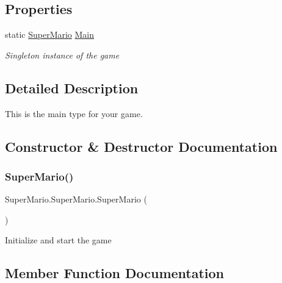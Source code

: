 \subsection*{Properties}
\begin{DoxyCompactItemize}
\item 
static \mbox{\hyperlink{class_super_mario_1_1_super_mario}{Super\+Mario}} \mbox{\hyperlink{class_super_mario_1_1_super_mario_abac25334ac6abafdedbf46774e6a198e}{Main}}
\begin{DoxyCompactList}\small\item\em Singleton instance of the game \end{DoxyCompactList}\end{DoxyCompactItemize}


\subsection{Detailed Description}
This is the main type for your game. 



\subsection{Constructor \& Destructor Documentation}
\mbox{\label{class_super_mario_1_1_super_mario_aaa56875411697b4bc007ec0b0c84a211}} 
\subsubsection{\texorpdfstring{Super\+Mario()}{SuperMario()}}
{\footnotesize\ttfamily Super\+Mario.\+Super\+Mario.\+Super\+Mario (\begin{DoxyParamCaption}{ }\end{DoxyParamCaption})}



Initialize and start the game 



\subsection{Member Function Documentation}
\mbox{\label{class_super_mario_1_1_super_mario_a456a3818b9edc077d202e582cf86ac03}} 
